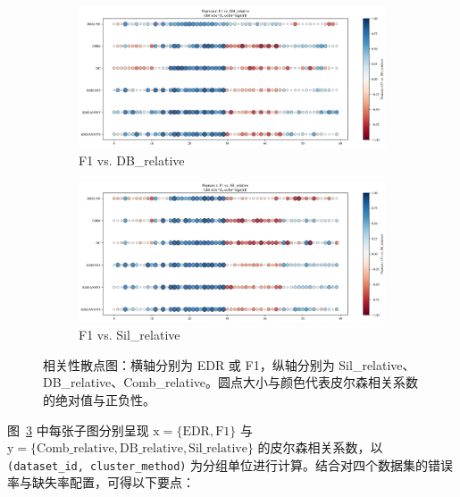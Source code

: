 \documentclass[10pt]{article} %
\numberwithin{equation}{section}
\begin{document}
\begin{enumerate}[label=(\alph*)]
\begin{figure}[htbp]
    \begin{subfigure}[b]{0.45\linewidth}
        \centering
        \includegraphics[width=\linewidth]{figures/point graph/dot_F1_vs_DB_relative_sorted.png}
        \caption{F1 vs. DB\_relative}
        \label{fig:dot_f1_db}
    \end{subfigure}
    \hfill
    \begin{subfigure}[b]{0.45\linewidth}
        \centering
        \includegraphics[width=\linewidth]{figures/point graph/dot_F1_vs_Sil_relative_sorted.png}
        \caption{F1 vs. Sil\_relative}
        \label{fig:dot_f1_sil}
    \end{subfigure}

    \caption{相关性散点图：横轴分别为 EDR 或 F1，纵轴分别为 Sil\_relative、DB\_relative、Comb\_relative。圆点大小与颜色代表皮尔森相关系数的绝对值与正负性。}
    \label{fig:correlation_scatter_six}
\end{figure}

图~\ref{fig:correlation_scatter_six} 中每张子图分别呈现 \(\mathrm{x}=\{\text{EDR}, \text{F1}\}\) 与 \(\mathrm{y}=\{\text{Comb\_relative}, \text{DB\_relative}, \text{Sil\_relative}\}\) 的皮尔森相关系数，以 \texttt{(dataset\_id, cluster\_method)} 为分组单位进行计算。结合对四个数据集的错误率与缺失率配置，可得以下要点：


\end{enumerate}
\end{document}
